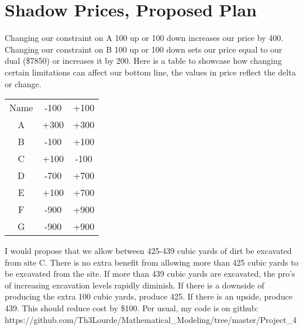 \documentclass[12pt]{article} %
\begin{document}
\section*{Shadow Prices, Proposed Plan}
Changing our constraint on A 100 up or 100 down increases our price by 400. Changing our constraint on B 100 up or 100 down sets our price equal to our dual (\$7850) or increases it by 200. Here is a table to showcase how changing certain limitations can affect our bottom line, the values in price reflect the delta or change.

\begin{center}
\begin{tabular}{ |c|c|c| }
 \hline
  Name & -100 & +100 \\
  A & +300 & +300  \\
  B & -100 & +100  \\
  C & +100 & -100  \\
  D & -700 & +700  \\
  E & +100 & +700  \\
  F & -900 & +900  \\
  G & -900 & +900  \\
 \hline
\end{tabular}
\end{center}

I would propose that we allow between 425-439 cubic yards of dirt be excavated from site C. There is no extra benefit from allowing more than 425 cubic yards to be excavated from the site. If more than 439 cubic yards are excavated, the pro's of increasing excavation levels rapidly diminish. If there is a downside of producing the extra 100 cubic yards, produce 425. If there is an upside, produce 439. This should reduce cost by \$100.
\linebreak
Per usual, my code is on github: https://github.com/Th3Lourde/Mathematical_Modeling/tree/master/Project_4



 
\end{document}
